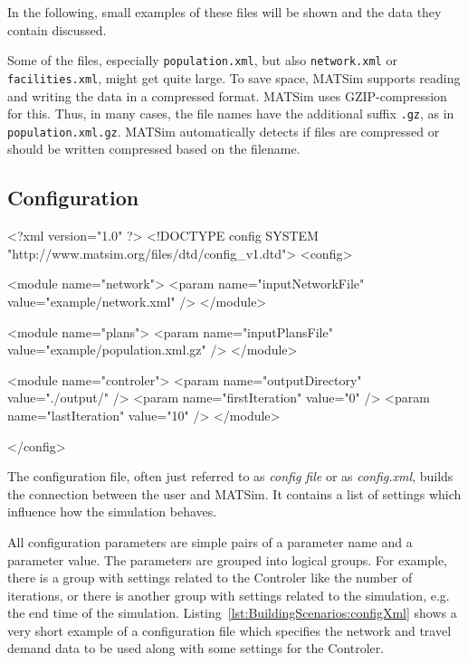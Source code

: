 In the following, small examples of these files will be shown and the data they
contain discussed.

\begin{note}
Some of the files, especially {\tt population.xml}, but also {\tt network.xml} 
or {\tt facilities.xml}, might get quite large. To save space, MATSim supports
reading and writing the data in a compressed format. MATSim uses  
GZIP-compression for this. Thus, in many cases, the file names have the 
additional suffix {\tt .gz}, as in {\tt population.xml.gz}. MATSim automatically
detects if files are compressed or should be written compressed based on the 
filename.
\end{note}

\subsection{Configuration}

\begin{xml-file}[caption=An example of a config.xml,
label=lst:BuildingScenarios:configXml]
<?xml version="1.0" ?>
<!DOCTYPE config SYSTEM "http://www.matsim.org/files/dtd/config_v1.dtd">
<config>

	<module name="network">
		<param name="inputNetworkFile" value="example/network.xml" />
	</module>

	<module name="plans">
		<param name="inputPlansFile" value="example/population.xml.gz" />
	</module>

	<module name="controler">
		<param name="outputDirectory" value="./output/" />
		<param name="firstIteration" value="0" />
		<param name="lastIteration" value="10" />
	</module>
	
</config>
\end{xml-file}

The configuration file, often just referred to as \emph{config file}
or as \emph{config.xml}, builds the connection between the user and MATSim.
It contains a list of settings which influence how the simulation behaves.

All configuration parameters are simple pairs of a parameter name and a
parameter value. The parameters are grouped into logical groups. For example,
there is a group with settings related to the Controler like the number of
iterations, or there is another group with settings related to the simulation,
e.g. the end time of the simulation.
Listing~\ref{lst:BuildingScenarios:configXml} shows a very short example of a
configuration file which specifies the network and travel demand data to be used
along with some settings for the Controler.

